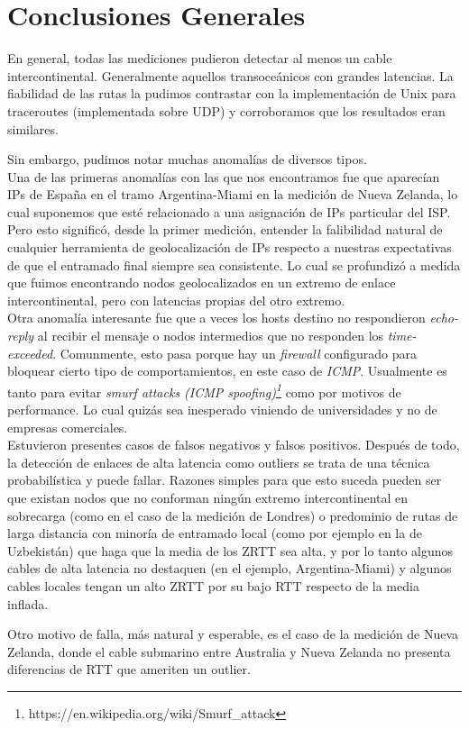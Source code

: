 \section{Conclusiones Generales}
En general, todas las mediciones pudieron detectar al menos un cable intercontinental. Generalmente aquellos transoceánicos con grandes latencias. La fiabilidad de las rutas la pudimos contrastar con la implementación de Unix para traceroutes (implementada sobre UDP) y corroboramos que los resultados eran similares.

Sin embargo, pudimos notar muchas anomalías de diversos tipos.
\\

Una de las primeras anomalías con las que nos encontramos fue que aparecían IPs de España en el tramo Argentina-Miami en la medición de Nueva Zelanda, lo cual suponemos que esté relacionado a una asignación de IPs particular del ISP. Pero esto significó, desde la primer medición, entender la falibilidad natural de cualquier herramienta de geolocalización de IPs respecto a nuestras expectativas de que el entramado final siempre sea consistente. Lo cual se profundizó a medida que fuimos encontrando nodos geolocalizados en un extremo de enlace intercontinental, pero con latencias propias del otro extremo.
\\

Otra anomalía interesante fue que a veces los hosts destino no respondieron \emph{echo-reply} al recibir el mensaje o nodos intermedios que no responden los \emph{time-exceeded}. Comunmente, esto pasa porque hay un \emph{firewall} configurado para bloquear cierto tipo de comportamientos, en este caso de \emph{ICMP}. Usualmente es tanto para evitar \emph{smurf attacks (ICMP spoofing)\footnote{https://en.wikipedia.org/wiki/Smurf_attack}} como por motivos de performance. Lo cual quizás sea inesperado viniendo de universidades y no de empresas comerciales.
\\

Estuvieron presentes casos de falsos negativos y falsos positivos. Después de todo, la detección de enlaces de alta latencia como outliers se trata de una técnica probabilística y puede fallar. Razones simples para que esto suceda pueden ser que existan nodos que no conforman ningún extremo intercontinental en sobrecarga (como en el caso de la medición de Londres) o predominio de rutas de larga distancia con minoría de entramado local (como por ejemplo en la de Uzbekistán) que haga que la media de los ZRTT sea alta, y por lo tanto algunos cables de alta latencia no destaquen (en el ejemplo, Argentina-Miami) y algunos cables locales tengan un alto ZRTT por su bajo RTT respecto de la media inflada.

Otro motivo de falla, más natural y esperable, es el caso de la medición de Nueva Zelanda, donde el cable submarino entre Australia y Nueva Zelanda no presenta diferencias de RTT que ameriten un outlier.
